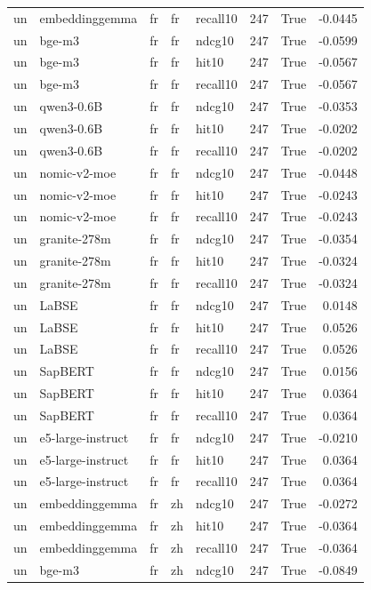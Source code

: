 \begin{tabular}{lllllrrr}
un & embeddinggemma & fr & fr & recall10 & 247 & True & -0.0445 \\
un & bge-m3 & fr & fr & ndcg10 & 247 & True & -0.0599 \\
un & bge-m3 & fr & fr & hit10 & 247 & True & -0.0567 \\
un & bge-m3 & fr & fr & recall10 & 247 & True & -0.0567 \\
un & qwen3-0.6B & fr & fr & ndcg10 & 247 & True & -0.0353 \\
un & qwen3-0.6B & fr & fr & hit10 & 247 & True & -0.0202 \\
un & qwen3-0.6B & fr & fr & recall10 & 247 & True & -0.0202 \\
un & nomic-v2-moe & fr & fr & ndcg10 & 247 & True & -0.0448 \\
un & nomic-v2-moe & fr & fr & hit10 & 247 & True & -0.0243 \\
un & nomic-v2-moe & fr & fr & recall10 & 247 & True & -0.0243 \\
un & granite-278m & fr & fr & ndcg10 & 247 & True & -0.0354 \\
un & granite-278m & fr & fr & hit10 & 247 & True & -0.0324 \\
un & granite-278m & fr & fr & recall10 & 247 & True & -0.0324 \\
un & LaBSE & fr & fr & ndcg10 & 247 & True & 0.0148 \\
un & LaBSE & fr & fr & hit10 & 247 & True & 0.0526 \\
un & LaBSE & fr & fr & recall10 & 247 & True & 0.0526 \\
un & SapBERT & fr & fr & ndcg10 & 247 & True & 0.0156 \\
un & SapBERT & fr & fr & hit10 & 247 & True & 0.0364 \\
un & SapBERT & fr & fr & recall10 & 247 & True & 0.0364 \\
un & e5-large-instruct & fr & fr & ndcg10 & 247 & True & -0.0210 \\
un & e5-large-instruct & fr & fr & hit10 & 247 & True & 0.0364 \\
un & e5-large-instruct & fr & fr & recall10 & 247 & True & 0.0364 \\
un & embeddinggemma & fr & zh & ndcg10 & 247 & True & -0.0272 \\
un & embeddinggemma & fr & zh & hit10 & 247 & True & -0.0364 \\
un & embeddinggemma & fr & zh & recall10 & 247 & True & -0.0364 \\
un & bge-m3 & fr & zh & ndcg10 & 247 & True & -0.0849 \\

\end{tabular}
